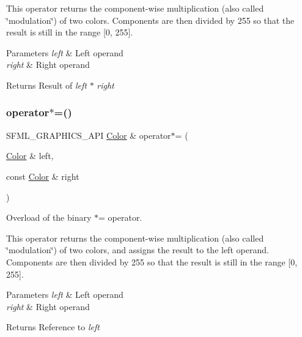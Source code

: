 This operator returns the component-\/wise multiplication (also called \char`\"{}modulation\char`\"{}) of two colors. Components are then divided by 255 so that the result is still in the range \mbox{[}0, 255\mbox{]}.


\begin{DoxyParams}{Parameters}
{\em left} & Left operand \\
\hline
{\em right} & Right operand\\
\hline
\end{DoxyParams}
\begin{DoxyReturn}{Returns}
Result of {\itshape left} $\ast$ {\itshape right} 
\end{DoxyReturn}
\mbox{\label{classsf_1_1_color_a8953be58a47ced92fb25966d6ee90511}} 
\subsubsection{\texorpdfstring{operator$\ast$=()}{operator*=()}}
{\footnotesize\ttfamily S\+F\+M\+L\+\_\+\+G\+R\+A\+P\+H\+I\+C\+S\+\_\+\+A\+PI \hyperlink{classsf_1_1_color}{Color} \& operator$\ast$= (\begin{DoxyParamCaption}\item[{\hyperlink{classsf_1_1_color}{Color} \&}]{left,  }\item[{const \hyperlink{classsf_1_1_color}{Color} \&}]{right }\end{DoxyParamCaption})\hspace{0.3cm}{\ttfamily [related]}}



Overload of the binary $\ast$= operator. 

This operator returns the component-\/wise multiplication (also called \char`\"{}modulation\char`\"{}) of two colors, and assigns the result to the left operand. Components are then divided by 255 so that the result is still in the range \mbox{[}0, 255\mbox{]}.


\begin{DoxyParams}{Parameters}
{\em left} & Left operand \\
\hline
{\em right} & Right operand\\
\hline
\end{DoxyParams}
\begin{DoxyReturn}{Returns}
Reference to {\itshape left} 
\end{DoxyReturn}
\mbox{\label{classsf_1_1_color_a90e79ecc276114cda519a88119ac645b}} 
